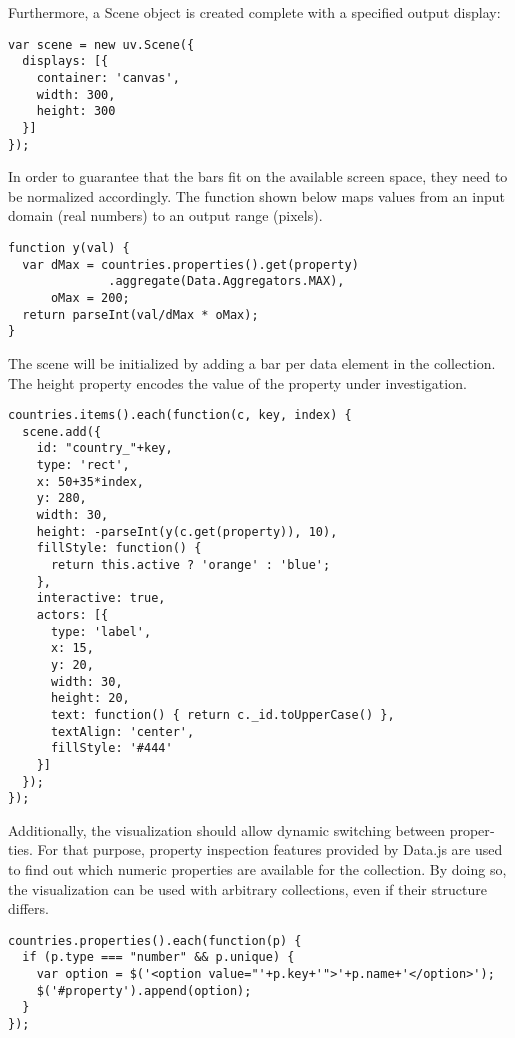 \begin{english}
\SuperPar Furthermore, a Scene object is created complete with a specified output display:

\begin{verbatim}
var scene = new uv.Scene({
  displays: [{
    container: 'canvas',
    width: 300,
    height: 300
  }]
});
\end{verbatim}

\SuperPar In order to guarantee that the bars fit on the available screen space, they need to be normalized accordingly. The function shown below maps values from an input domain (real numbers) to an output range (pixels).

\begin{verbatim}
function y(val) {
  var dMax = countries.properties().get(property)
              .aggregate(Data.Aggregators.MAX),
      oMax = 200;
  return parseInt(val/dMax * oMax);
}
\end{verbatim}


\SuperPar The scene will be initialized by adding a bar per data element in the collection. The height property encodes the value of the property under investigation.

\begin{verbatim}  
countries.items().each(function(c, key, index) {
  scene.add({
    id: "country_"+key,
    type: 'rect',
    x: 50+35*index,
    y: 280,
    width: 30,
    height: -parseInt(y(c.get(property)), 10),
    fillStyle: function() {
      return this.active ? 'orange' : 'blue'; 
    },
    interactive: true,
    actors: [{
      type: 'label',
      x: 15,
      y: 20,
      width: 30,
      height: 20,
      text: function() { return c._id.toUpperCase() },
      textAlign: 'center',
      fillStyle: '#444'
    }]
  });
});
\end{verbatim}

\SuperPar Additionally, the visualization should allow dynamic switching between properties. For that purpose, property inspection features provided by Data.js are used to find out which numeric properties are available for the collection. By doing so, the visualization can be used with arbitrary collections, even if their structure differs.

\begin{verbatim}
countries.properties().each(function(p) {
  if (p.type === "number" && p.unique) {
    var option = $('<option value="'+p.key+'">'+p.name+'</option>');
    $('#property').append(option);
  }
});
\end{verbatim}


\end{english}
